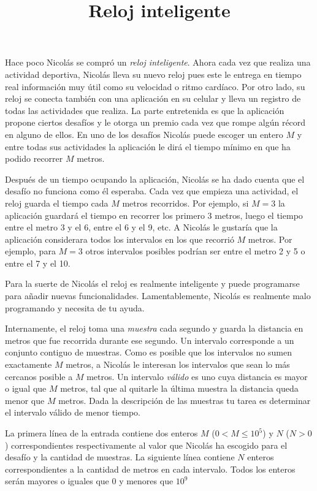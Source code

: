 \documentclass{oci}
\title{Reloj inteligente}
\begin{document}
\begin{problemDescription}
  Hace poco Nicolás se compró un \emph{reloj inteligente}.
  Ahora cada vez que realiza una actividad deportiva, Nicolás lleva su nuevo
  reloj pues este le entrega en tiempo real información muy útil como su
  velocidad o ritmo cardíaco.
  Por otro lado, su reloj se conecta también con una aplicación en su celular y
  lleva un registro de todas las actividades que realiza.
  La parte entretenida es que la aplicación propone ciertos desafíos y le otorga
  un premio cada vez que rompe algún récord en alguno de ellos.
  En uno de los desafíos Nicolás puede escoger un entero $M$ y entre todas sus
  actividades la aplicación le dirá el tiempo mínimo en que ha podido recorrer
  $M$ metros.

  Después de un tiempo ocupando la aplicación, Nicolás se ha dado cuenta que el
  desafío no funciona como él esperaba.
  Cada vez que empieza una actividad, el reloj guarda el tiempo cada $M$
  metros recorridos.
  Por ejemplo, si $M=3$ la aplicación guardará el tiempo en
  recorrer los primero 3 metros, luego el tiempo entre el metro 3 y
  el 6, entre el 6 y el 9, etc.
  A Nicolás le gustaría que la aplicación considerara todos los intervalos en
  los que recorrió $M$ metros.
  Por ejemplo, para $M=3$ otros intervalos posibles podrían ser entre el
  metro 2 y 5 o entre el 7 y el 10.

  Para la suerte de Nicolás el reloj es realmente inteligente y puede
  programarse para añadir nuevas funcionalidades.
  Lamentablemente, Nicolás es realmente malo programando y necesita de tu ayuda.

  Internamente, el reloj toma una \emph{muestra} cada segundo y guarda la
  distancia en metros que fue recorrida durante ese segundo.
  Un intervalo corresponde a un conjunto contiguo de muestras.
  Como es posible que los intervalos no sumen exactamente $M$ metros, a
  Nicolás le interesan los intervalos que sean lo más cercanos posible a $M$
  metros.
  Un intervalo \emph{válido} es uno cuya distancia es mayor o igual que $M$ metros,
  tal que al quitarle la última muestra la distancia queda menor que $M$ metros.
  Dada la descripción de las muestras tu tarea es determinar el intervalo
  válido de menor tiempo.

\end{problemDescription}

\begin{inputDescription}
  La primera línea de la entrada contiene dos enteros $M$ ($0<M\leq 10^5$) y $N$
  ($N > 0$) correspondientes respectivamente al valor que Nicolás ha escogido
  para el desafío y la cantidad de muestras.
  La siguiente línea contiene $N$ enteros correspondientes a la cantidad de
  metros en cada intervalo.
  Todos los enteros serán mayores o iguales que 0 y menores que $10^9$
\end{inputDescription}
\end{document}
